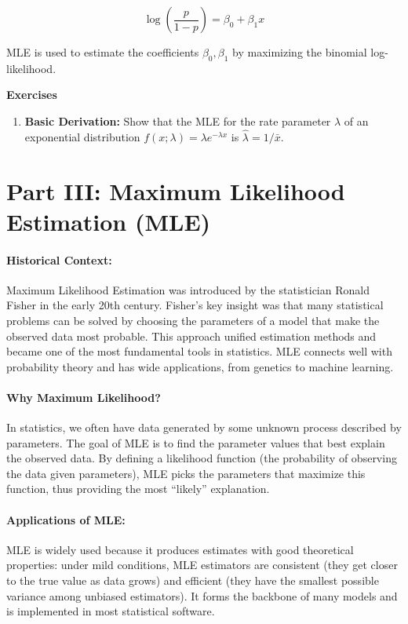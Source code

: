 \documentclass{book}
\begin{document}
\[
\log\left( \frac{p}{1 - p} \right) = \beta_0 + \beta_1 x
\]

MLE is used to estimate the coefficients $\beta_0, \beta_1$ by maximizing the binomial log-likelihood.

\newpage

\textbf{Exercises}
\begin{enumerate}
\item \textbf{Basic Derivation:} Show that the MLE for the rate parameter $\lambda$ of an exponential distribution $f(x; \lambda) = \lambda e^{-\lambda x}$ is $\hat{\lambda} = 1 / \bar{x}$.
\end{enumerate}

\section*{Part III: Maximum Likelihood Estimation (MLE)}

\paragraph{Historical Context:}
Maximum Likelihood Estimation was introduced by the statistician Ronald Fisher in the early 20th century. Fisher’s key insight was that many statistical problems can be solved by choosing the parameters of a model that make the observed data most probable. This approach unified estimation methods and became one of the most fundamental tools in statistics. MLE connects well with probability theory and has wide applications, from genetics to machine learning.

\paragraph{Why Maximum Likelihood?}
In statistics, we often have data generated by some unknown process described by parameters. The goal of MLE is to find the parameter values that best explain the observed data. By defining a likelihood function (the probability of observing the data given parameters), MLE picks the parameters that maximize this function, thus providing the most “likely” explanation.

\paragraph{Applications of MLE:}
MLE is widely used because it produces estimates with good theoretical properties: under mild conditions, MLE estimators are consistent (they get closer to the true value as data grows) and efficient (they have the smallest possible variance among unbiased estimators). It forms the backbone of many models and is implemented in most statistical software.
\end{document}
